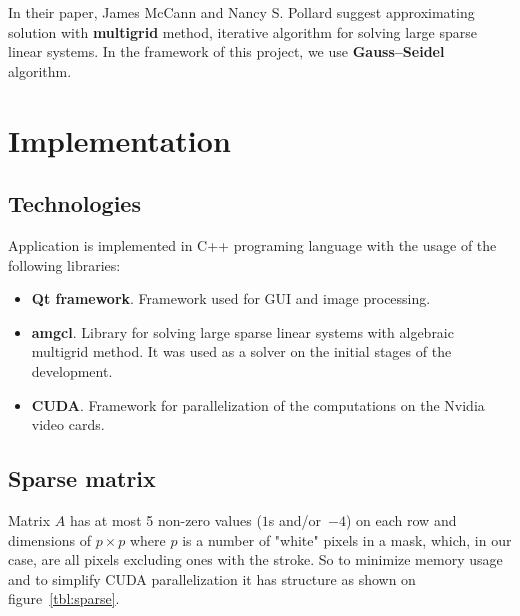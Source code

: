 \documentclass[hidelinks, english]{report}
\begin{document}
In their paper\cite{gradient}, James McCann and Nancy S. Pollard suggest approximating solution with \textbf{multigrid}
method, iterative algorithm for solving large sparse linear systems. In the framework of this project, we use
\textbf{Gauss–Seidel} algorithm.

\section{Implementation}

\subsection{Technologies}

Application is implemented in C++ programing language with the usage of the following libraries:

\begin{itemize}
    \item \textbf{Qt framework}. Framework used for GUI and image processing.
    \item \textbf{amgcl}. Library for solving large sparse linear systems with algebraic multigrid method. It was used
    as a solver on the initial stages of the development.
    \item \textbf{CUDA}. Framework for parallelization of the computations on the Nvidia video cards.
\end{itemize}


\subsection{Sparse matrix}

Matrix $A$ has at most 5 non-zero values ($1$s and/or~$-4$) on each row and dimensions of $p \times p$ where $p$ is
a number of "white" pixels in a mask, which, in our case, are all pixels excluding ones with the stroke. So to minimize
memory usage and to simplify CUDA parallelization it has structure as shown on figure~\ref{tbl:sparse}.
\end{document}
